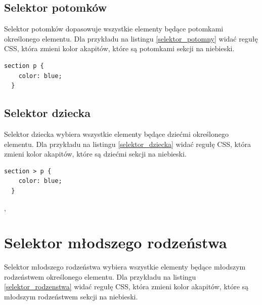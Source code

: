 \documentclass[a4paper,12pt]{book} %
\begin{document}
\clearpage\subsection{Selektor potomków}
Selektor potomków dopasowuje wszystkie elementy będące potomkami określonego elementu. Dla przykładu na listingu \ref{selektor_potomny} widać regułę CSS, która zmieni kolor akapitów, które są potomkami sekcji na niebieski.



\begin{lstfloat}[hb]
  \lstset{language=HTML}
  \begin{lstlisting}[frame=single]
  section p {
    color: blue;
  }\end{lstlisting}

  \caption{Reguła z selektorem akapitów, które są potomkami sekcji}
  \label{selektor_potomny}

\end{lstfloat}



\subsection{Selektor dziecka}

Selektor dziecka wybiera wszystkie elementy będące dziećmi określonego elementu. Dla przykładu na listingu \ref{selektor_dziecka} widać regułę CSS, która zmieni kolor akapitów, które są dziećmi sekcji na niebieski.


\begin{lstfloat}[hb]
  \lstset{language=HTML}
  \begin{lstlisting}[frame=single]
  section > p {
    color: blue;
  }\end{lstlisting}

  \caption{Reguła z selektorem akapitów, które są dziećmi sekcji},
  \label{selektor_dziecka}

\end{lstfloat}




\section{Selektor młodszego rodzeństwa}
Selektor młodszego rodzeństwa wybiera wszystkie elementy będące młodszym rodzeństwem określonego elementu. Dla przykładu na listingu \ref{selektor_rodzenstwa} widać regułę CSS, która zmieni kolor akapitów, które są młodszym rodzeństwem sekcji na niebieski.
\end{document}
